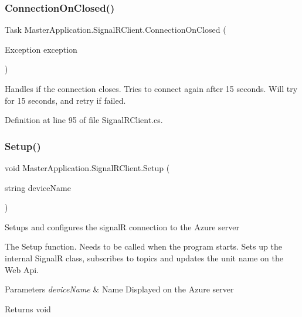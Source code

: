\subsubsection{\texorpdfstring{Connection\+On\+Closed()}{ConnectionOnClosed()}}
{\footnotesize\ttfamily Task Master\+Application.\+Signal\+R\+Client.\+Connection\+On\+Closed (\begin{DoxyParamCaption}\item[{Exception}]{exception }\end{DoxyParamCaption})\hspace{0.3cm}{\ttfamily [private]}}

Handles if the connection closes. Tries to connect again after 15 seconds. Will try for 15 seconds, and retry if failed. 

Definition at line 95 of file Signal\+R\+Client.\+cs.

\mbox{\label{class_master_application_1_1_signal_r_client_a510d16bef7f5c25be0b4bd6e2927df73}} 
\subsubsection{\texorpdfstring{Setup()}{Setup()}}
{\footnotesize\ttfamily void Master\+Application.\+Signal\+R\+Client.\+Setup (\begin{DoxyParamCaption}\item[{string}]{device\+Name }\end{DoxyParamCaption})}



Setups and configures the signalR connection to the Azure server 

The Setup function. Needs to be called when the program starts. Sets up the internal SignalR class, subscribes to topics and updates the unit name on the Web Api.


\begin{DoxyParams}{Parameters}
{\em device\+Name} & Name Displayed on the Azure server\\
\hline
\end{DoxyParams}
\begin{DoxyReturn}{Returns}
void
\end{DoxyReturn}



